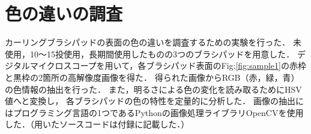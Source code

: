 \documentclass[main]{subfiles}
\begin{document}
\section{色の違いの調査}
カーリングブラシパッドの表面の色の違いを調査するための実験を行った．
未使用，10～15投使用，長期間使用したものの3つのブラシパッドを用意した．
デジタルマイクロスコープを用いて，各ブラシパッド表面のFig:\ref{fig:sample1}の赤枠と黒枠の2箇所の高解像度画像を得た．
得られた画像からRGB（赤，緑，青）の色情報の抽出を行った．
また，明るさによる色の変化を読み取るためにHSV値へと変換し，
各ブラシパッドの色の特性を定量的に分析した．
画像の抽出にはプログラミング言語の1つであるPythonの画像処理ライブラリOpenCVを使用した．（用いたソースコードは付録に記載した．）
\end{document}

